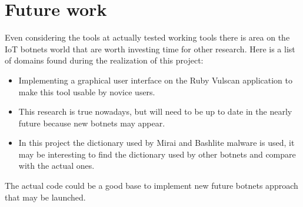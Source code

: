 \documentclass{report}
\begin{document}
\chapter{Future work}
Even considering the tools at actually tested working tools there is area on the IoT botnets world that are worth investing time for other research. Here is a list of domains found during the realization of this project:
\begin{itemize}
 \item Implementing a graphical user interface on the Ruby Vulscan application to make this tool usable by novice users.
 \item This research is true nowadays, but will need to be up to date in the nearly future because new botnets may appear.
 \item In this project the dictionary used by Mirai and Bashlite malware is used, it may be interesting to find the dictionary used by other botnets and compare with the actual ones.
\end{itemize}
The actual code could be a good base to implement new future botnets approach that may be launched.

\printbibliography

\listoffigures
\end{document}
